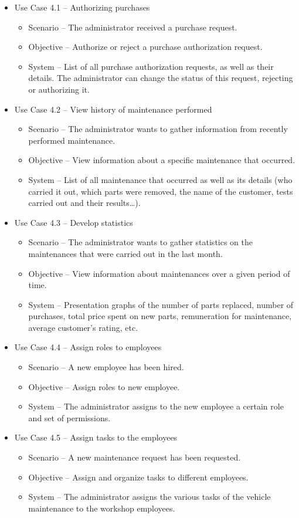 \begin{itemize}
  \item Use Case 4.1 – Authorizing purchases
  \begin{itemize}
    \item Scenario –  The administrator received a purchase request.
    \item Objective – Authorize or reject a purchase authorization request.
    \item System – List of all purchase authorization requests, as well as their details. The administrator can change the status of this request, rejecting or authorizing it. 
  \end{itemize}
  \item Use Case 4.2 – View history of maintenance performed
  \begin{itemize}
    \item Scenario – The administrator wants to gather information from recently performed maintenance.
    \item Objective – View information about a specific maintenance that occurred.
    \item System – List of all maintenance that occurred as well as its details (who carried it out, which parts were removed, the name of the customer, tests carried out and their results…). 
  \end{itemize}
  \item Use Case 4.3 – Develop statistics
  \begin{itemize}
    \item Scenario – The administrator wants to gather statistics on the maintenances that were carried out in the last month.
    \item Objective – View information about maintenances over a given period of time.
    \item System – Presentation graphs of the number of parts replaced, number of purchases, total price spent on new parts, remuneration for maintenance, average customer's rating, etc.
  \end{itemize}
  \item Use Case 4.4 – Assign roles to employees
  \begin{itemize}
    \item Scenario – A new employee has been hired.
    \item Objective –  Assign roles to new employee.
    \item System – The administrator assigns to the new employee a certain role and set of permissions.
  \end{itemize}
  \item Use Case 4.5 – Assign tasks to the employees
  \begin{itemize}
    \item Scenario – A new maintenance request has been requested.
    \item Objective – Assign and organize tasks to different employees.
    \item System – The administrator assigns the various tasks of the vehicle maintenance to the workshop employees.
  \end{itemize}
\end{itemize}
\hfill \break

